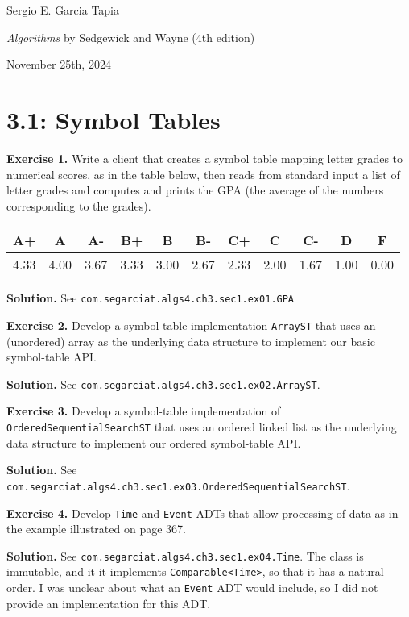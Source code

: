 \documentclass[12pt, a4paper]{article}
\newenvironment{ex}[2][Exercise]
{\par\medskip\noindent \textbf{#1 #2.}}
{\medskip}
\newenvironment{sol}[1][Solution]
{\par\medskip\noindent \textbf{#1.} }
{\medskip}
\begin{document}
	\noindent Sergio E. Garcia Tapia \hfill
	
	\noindent \emph{Algorithms} by Sedgewick and Wayne (4th edition) \cite{sedgewick_wayne}\hfill
	
	\noindent November 25th, 2024\hfill 
	\section*{3.1: Symbol Tables}
	\begin{ex}{1}
		Write a client that creates a symbol table mapping letter grades to numerical
		scores, as in the table below, then reads from standard input a list of letter grades
		and computes and prints the GPA (the average of the numbers corresponding to the
		grades).
		
		\begin{center}
			\begin{tabular}{c|c|c|c|c|c|c|c|c|c|c}
				A+ & A & A- & B+ & B & B- & C+ & C & C- & D & F\\
				\hline
				4.33 & 4.00 & 3.67 & 3.33 & 3.00 & 2.67 & 2.33 & 2.00 & 1.67 & 1.00 & 0.00
			\end{tabular}
		\end{center}
	\end{ex}
	\begin{sol}
		See \texttt{com.segarciat.algs4.ch3.sec1.ex01.GPA}
	\end{sol}
	\begin{ex}{2}
		Develop a symbol-table implementation \texttt{ArrayST} that uses an (unordered)
		array as the underlying data structure to implement our basic symbol-table API.
	\end{ex}
	\begin{sol}
		See \texttt{com.segarciat.algs4.ch3.sec1.ex02.ArrayST}.
	\end{sol}
	\begin{ex}{3}
		Develop a symbol-table implementation of \texttt{OrderedSequentialSearchST} that
		uses an ordered linked list as the underlying data structure to implement our
		ordered symbol-table API.
	\end{ex}
	\begin{sol}
		See \texttt{com.segarciat.algs4.ch3.sec1.ex03.OrderedSequentialSearchST}.
	\end{sol}
	\begin{ex}{4}
		Develop \texttt{Time} and \texttt{Event} ADTs that allow processing of data as in
		the example illustrated on page 367.
	\end{ex}
	\begin{sol}
		See \texttt{com.segarciat.algs4.ch3.sec1.ex04.Time}. The class is immutable, and it
		it implements \texttt{Comparable<Time>}, so that it has a natural order.
		I was unclear about what an \texttt{Event} ADT would include, so I did not provide
		an implementation for this ADT.
	\end{sol}
\end{document}
